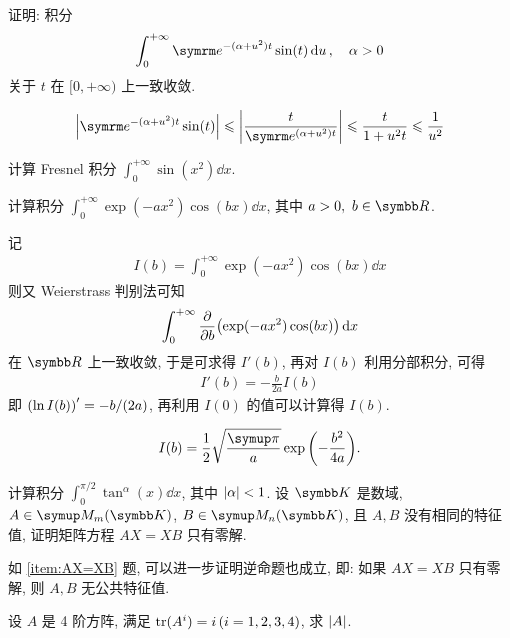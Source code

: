 \begin{exercise}[series=exer]
\begin{hint}
    \end{hint}
    \item 证明: 积分 
    \begin{align*}
        \int_{0}^{+\infty} \me^{-(\alpha + u^{2})t} \sin(t) \dd{u},\quad \alpha > 0
    \end{align*}
    关于 $ t $ 在 $ [0, +\infty) $ 上一致收敛.
    \begin{hint}
        \begin{align*}
            \abs{\me^{-(\alpha + u^{2})t} \sin(t)} \le \abs{\frac{t}{\me^{(\alpha + u^{2})t}}} \le \frac{t}{1 + u^{2}t} \le \frac{1}{u^{2}}
        \end{align*}
    \end{hint}
    \hitem 计算 Fresnel 积分 $ \int_{0}^{+\infty} \sin(x^{2}) \dd{x} $.
    \item 计算积分 $ \int_{0}^{+\infty} \exp(-a x^{2})\cos(bx) \dd{x} $, 其中 $ a > 0,\ b\in \R $.
    \begin{hint}
        记
        \begin{align*}
            I(b) = \int_{0}^{+\infty} \exp(-a x^{2})\cos(bx) \dd{x}
        \end{align*}
        则又 Weierstrass 判别法可知
        \begin{align*}
            \int_{0}^{+\infty} \pdv{b}\qty(\exp(-a x^{2})\cos(bx)) \dd{x}
        \end{align*}
        在 $ \R $ 上一致收敛, 于是可求得 $ I'(b) $, 再对 $ I(b) $ 利用分部积分, 可得
        \begin{align*}
            I'(b) = -\frac{b}{2a}I(b)
        \end{align*}
        即 $ \qty(\ln I(b))' = -b/(2a) $, 再利用 $ I(0) $ 的值可以计算得 $ I(b) $. 
    \end{hint}
    \begin{answer}
        \begin{align*}
            I(b) = \frac{1}{2}\sqrt{\frac{\pi}{a}}\exp\qty(-\frac{b^{2}}{4a}).
        \end{align*}
    \end{answer}
    \item 计算积分 $ \int_{0}^{\pi/2} \tan^{\alpha}(x) \dd{x} $, 其中 $ \abs{\alpha} < 1 $. 
    \sitem\label{item:AX=XB} 设 $ \K $ 是数域, $ A \in \MM[\K][m] $, $ B \in \MM[\K][n] $, 且 $ A, B $ 没有相同的特征值, 证明矩阵方程 $ AX = XB $ 只有零解.
    \item 如 \ref{item:AX=XB} 题, 可以进一步证明逆命题也成立, 即: 如果 $ AX = XB $ 只有零解, 则 $ A, B $ 无公共特征值.
    \item 设 $ A $ 是 4 阶方阵, 满足 $ \tr(A^{i}) = i\,(i = 1, 2, 3, 4) $, 求 $ \abs{A} $. 

\end{exercise}
